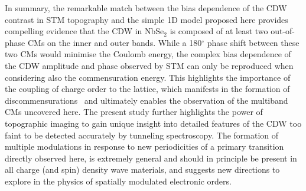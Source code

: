 \documentclass[aps,prl,twocolumn,superscriptaddress]{revtex4-2}
\begin{document}
In summary, the remarkable match between the bias dependence of the CDW contrast in STM topography and the simple 1D model proposed here provides compelling evidence that the CDW in NbSe$_2$ is composed of at least two out-of-phase CMs on the inner and outer bands. While a 180$^\circ$ phase shift between these two CMs would minimise the Coulomb energy, the complex bias dependence of the CDW amplitude and phase observed by STM can only be reproduced when considering also the commensuration energy. This highlights the importance of the coupling of charge order to the lattice, which manifests in the formation of discommensurations~\cite{McMillan1976, Pasztor2019} and ultimately enables the observation of the multiband CMs uncovered here. The present study further highlights the power of topographic imaging to gain unique insight into detailed features of the CDW too faint to be detected accurately by tunneling spectroscopy. The formation of multiple modulations in response to new periodicities of a primary transition directly observed here, is extremely general and should in  principle be  present in all charge (and spin) density wave materials, and suggests new directions to explore in the physics of spatially modulated electronic orders. 




%
\end{document}
